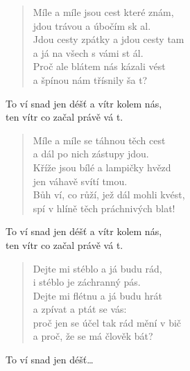 \begin{song}{}
\begin{verse}
   Míle a míle jsou cest které znám, \\
   jdou trávou a úbočím sk al. \\
   Jdou cesty zpátky a jdou cesty tam  \\
   a já na všech s vámi st ál. \\
   Proč ale blátem nás kázali vést \\
   a špínou nám třísnily ša t?
\end{verse}
\begin{refren}
   To ví snad jen déšť a vítr kolem nás, \\
   ten vítr co začal právě vá t.
\end{refren}
\begin{verse}
   Míle a míle se táhnou těch cest \\
   a dál po nich zástupy jdou. \\
   Kříže jsou bílé a lampičky hvězd \\
   jen váhavě svítí tmou. \\
   Bůh ví, co růží, jež dál mohli kvést, \\
   spí v hlíně těch práchnivých blat!
\end{verse}

\chordbreak
\compactbreak

\begin{refren}
   To ví snad jen déšť a vítr kolem nás, \\
   ten vítr co začal právě vá t.
\end{refren}
\begin{verse}
  Dejte mi stéblo a já budu rád, \\
   i stéblo je záchranný pás. \\
   Dejte mi flétnu a já budu hrát \\
   a zpívat a ptát se vás: \\
   proč jen se účel tak rád mění v bič \\
   a proč, že se má člověk bát?
\end{verse}
\begin{refren}
   To ví snad jen déšť\ldots
\end{refren}
\end{song}
\pagebreak
